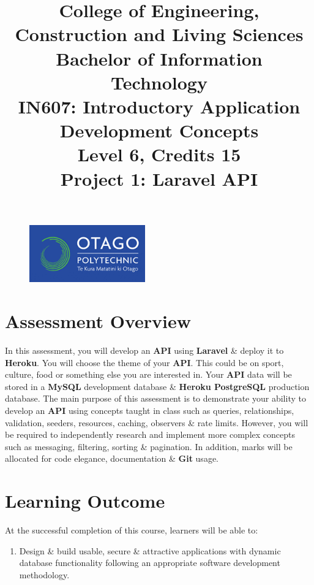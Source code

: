 \documentclass{article}
\author{}
\begin{document}
\begin{figure}
	\centering
	\includegraphics[width=50mm]{../img/logo.png}
\end{figure}

\title{College of Engineering, Construction and Living Sciences\\Bachelor of Information Technology\\IN607: Introductory Application Development Concepts\\Level 6, Credits 15\\\textbf{Project 1: Laravel API}}
\date{}
\maketitle

\section*{Assessment Overview}
In this assessment, you will develop an \textbf{API} using \textbf{Laravel} \& deploy it to \textbf{Heroku}. You will choose the theme of your \textbf{API}. This could be on sport, culture, food or something else you are interested in. Your \textbf{API} data will be stored in a \textbf{MySQL} development database \& \textbf{Heroku PostgreSQL} production database. The main purpose of this assessment is to demonstrate your ability to develop an \textbf{API} using concepts taught in class such as queries, relationships, validation, seeders, resources, caching, observers \& rate limits. However, you will be required to independently research and implement more complex concepts such as messaging, filtering, sorting \& pagination. In addition, marks will be allocated for code elegance, documentation \& \textbf{Git} usage. 

\section*{Learning Outcome}
At the successful completion of this course, learners will be able to:
\begin{enumerate}
	\item Design \& build usable, secure \& attractive applications with dynamic database functionality following an appropriate software development methodology.
\end{enumerate}
\end{document}
